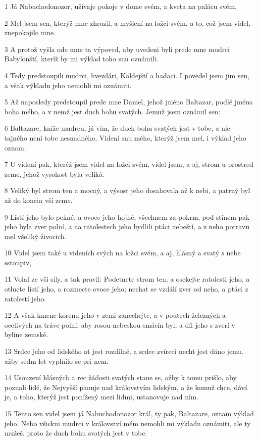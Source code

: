 \par 1 Já Nabuchodonozor, užívaje pokoje v dome svém, a kveta na palácu svém,
\par 2 Mel jsem sen, kterýž mne zhrozil, a myšlení na ložci svém, a to, což jsem videl, znepokojilo mne.
\par 3 A protož vyšla ode mne ta výpoved, aby uvedeni byli prede mne mudrci Babylonští, kteríž by mi výklad toho snu oznámili.
\par 4 Tedy predstoupili mudrci, hvezdári, Kaldejští a hadaci. I povedel jsem jim sen, a však výkladu jeho nemohli mi oznámiti.
\par 5 Až naposledy predstoupil prede mne Daniel, jehož jméno Baltazar, podlé jména boha mého, a v nemž jest duch bohu svatých. Jemuž jsem oznámil sen:
\par 6 Baltazare, kníže mudrcu, já vím, že duch bohu svatých jest v tobe, a nic tajného není tobe nesnadného. Videní snu mého, kterýž jsem mel, i výklad jeho oznam.
\par 7 U videní pak, kteréž jsem videl na ložci svém, videl jsem, a aj, strom u prostred zeme, jehož vysokost byla veliká.
\par 8 Veliký byl strom ten a mocný, a výsost jeho dosahovala až k nebi, a patrný byl až do koncin vší zeme.
\par 9 Lístí jeho bylo pekné, a ovoce jeho hojné, všechnem za pokrm, pod stínem pak jeho byla zver polní, a na ratolestech jeho bydlili ptáci nebeští, a z neho potravu mel všeliký živocich.
\par 10 Videl jsem také u videních svých na ložci svém, a aj, hlásný a svatý s nebe sstoupiv,
\par 11 Volal ze vší síly, a tak pravil: Podetnete strom ten, a osekejte ratolesti jeho, a otlucte lístí jeho, a rozmecte ovoce jeho; nechat se vzdálí zver od neho, a ptáci z ratolestí jeho.
\par 12 A však kmene korenu jeho v zemi zanechejte, a v poutech železných a ocelivých na tráve polní, aby rosou nebeskou smácín byl, a díl jeho s zverí v byline zemské.
\par 13 Srdce jeho od lidského at jest rozdílné, a srdce zvírecí necht jest dáno jemu, ažby sedm let vyplnilo se pri nem.
\par 14 Usouzení hlásných a rec žádosti svatých stane se, ažby k tomu prišlo, aby poznali lidé, že Nejvyšší panuje nad královstvím lidským, a že komuž chce, dává je, a toho, kterýž jest ponížený mezi lidmi, ustanovuje nad ním.
\par 15 Tento sen videl jsem já Nabuchodonozor král, ty pak, Baltazare, oznam výklad jeho. Nebo všickni mudrci v království mém nemohli mi výkladu oznámiti, ale ty mužeš, proto že duch bohu svatých jest v tobe.
